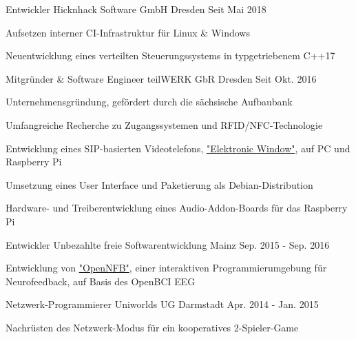 
\begin{cventries}

  \cventry
    {Entwickler} %
    {Hicknhack Software GmbH} %
    {Dresden} %
    {Seit Mai 2018} %
    {
      \begin{cvitems} %
        \item {Aufsetzen interner CI-Infrastruktur für Linux \& Windows }
        \item {Neuentwicklung eines verteilten Steuerungssystems in typgetriebenem C++17 }
      \end{cvitems}
    }

  \cventry
    {Mitgründer \& Software Engineer} %
    {teilWERK GbR} %
    {Dresden} %
    {Seit Okt. 2016} %
    {
      \begin{cvitems} %
        \item {Unternehmensgründung, gefördert durch die sächsische Aufbaubank}
        \item {Umfangreiche Recherche zu Zugangssystemen und RFID/NFC-Technologie}
        \item {Entwicklung eines SIP-basierten Videotelefons, \href{https://ewindow.org}{"Elektronic Window"}, auf PC und Raspberry Pi}
        \item {Umsetzung eines User Interface und Paketierung als Debian-Distribution }
        \item {Hardware- und Treiberentwicklung eines Audio-Addon-Boards für das Raspberry Pi}
      \end{cvitems}
    }

  \cventry
    {Entwickler} %
    {Unbezahlte freie Softwarentwicklung} %
    {Mainz} %
    {Sep. 2015 - Sep. 2016} %
    {
      \begin{cvitems} %
        \item {Entwicklung von \href{https://github.com/strfry/OpenNFB}{"OpenNFB"}, einer interaktiven Programmierumgebung für Neurofeedback, auf Basis des OpenBCI EEG}
      \end{cvitems}
    }

  \cventry
    {Netzwerk-Programmierer} %
    {Uniworlds UG} %
    {Darmstadt} %
    {Apr. 2014 - Jan. 2015} %
    {
      \begin{cvitems} %
        \item {Nachrüsten des Netzwerk-Modus für ein kooperatives 2-Spieler-Game}
      \end{cvitems}
    }


\end{cventries}
